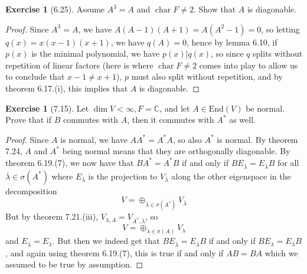 \documentclass[reqno]{amsart}
\theoremstyle{definition}
\newtheorem{exercise}[theorem]{Exercise}
\theoremstyle{remark}
\DeclareMathOperator{\Char}{char}
\newcommand{\End}{{\mathrm{End}}}
\begin{document}
\begin{exercise}[6.25]
    Assume $A^3 = A$ and $\Char F \neq 2$. Show that
    $A$ is diagonable.
\end{exercise}

\begin{proof}
    Since $A^3 = A$, we have
    $A (A-1) (A+1) = A \left( A^2 - 1 \right) =
    0$, so
    letting $q (x) = x (x-1) (x+1)$, we have
    $q (A) = 0$, hence by lemma 6.10, if $p(x)$ is the
    minimal polynomial, we have $p(x) | q(x)$, so since
    $q$ splits without repetition of linear factors (here is where
    $\Char F \neq 2$ comes into play to allow us
    to conclude that $x-1 \neq x+1$), $p$ must also
    split without repetition, and
    by theorem 6.17.(i), this implies that
    $A$ is diagonable.
\end{proof}



\begin{exercise}[7.15]
    Let $\dim V < \infty, F = \mathbb{C}$, and let
    $A \in \End (V)$ be normal. Prove that if $B$ commutes
    with $A$, then it commutes with $A^{*}$ as well.
\end{exercise}

\begin{proof}
    Since $A$ is normal, we have $A A^{*} = A^{*} A$, so also
    $A^{*}$ is normal.
    By theorem 7.24, $A$ and $A^{*}$ being normal means
    that they are orthogonally diagonable. By theorem 6.19.(7), we
    now have that $B A^{*} = A^{*} B$ if
    and only if $B E_{\overline{\lambda}} = E_{\overline{\lambda}} B$ 
    for
    all $\overline{\lambda}
    \in \sigma \left( A^{*} \right) $ where
    $E_{\overline{\lambda}}$ is the projection to
    $V_{\overline{\lambda}}$ along the other eigenspace in the
    decomposition
    \[
    V = \oplus_{\overline{\lambda} \in \sigma (A^{*})} 
    V_{\overline{\lambda}}
    \] 
    But by theorem 7.21.(iii),
    $V_{\lambda, A} = V_{A^{*}, \overline{\lambda}}$, so
     \[
    V = \oplus_{\lambda \in \sigma(A)}V_{\lambda}
    \] 
    and $E_{\overline{\lambda}} = E_{\lambda}$. But
    then we indeed get that
    $B E_{\overline{\lambda}} = E_{\overline{\lambda}}B$ if
    and only if
    $B E_{\lambda} = E_{\lambda} B$, and again
    using theorem 6.19.(7), this is
    true if and only if $AB = BA$ which we assumed to
    be true by assumption. 
\end{proof}
\end{document}
